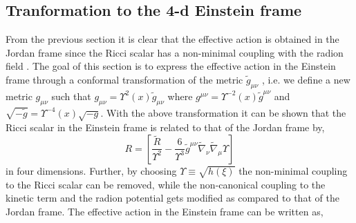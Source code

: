 \documentclass{article}
\begin{document}
  
\subsection{Tranformation to the 4-d Einstein frame}
\label{S3-2}
From the previous section it is clear that the effective action is obtained in the Jordan frame since the Ricci scalar has a non-minimal coupling with the radion field \cite{Karam:2018squ}. The goal of this section is to express the effective action in the Einstein frame through a conformal transformation of the metric $\tilde{g}_{\mu\nu}$ \cite{PhysRevD.65.023521,RevModPhys.82.451,DeFelice2010,PhysRevD.92.026008,0264-9381-14-12-010,BARROW1988515,1475-7516-2005-04-014,PhysRevD.76.084039,1475-7516-2013-10-040}, i.e. we define a new metric $g_{\mu\nu}$ such that $g_{\mu\nu}=\Upsilon^2(x) \tilde{g}_{\mu\nu}$ where $g^{\mu\nu}=\Upsilon^{-2}(x) \tilde{g}^{\mu\nu}$ and $\sqrt{-\tilde{g}}=\Upsilon^{-4}(x)\sqrt{-g}$.
With the above transformation it can be shown that the Ricci scalar in the Einstein frame is related to that of the Jordan frame by,
\begin{equation}
R=\left[\frac{\tilde{R}}{\Upsilon^2}
-\frac{6}{\Upsilon^3}\tilde{g}^{\mu\nu}\tilde{\nabla}_\nu\tilde{\nabla}_\mu\Upsilon \right]
\label{Eq16}
\end{equation}
in four dimensions.
Further, by choosing $\Upsilon \equiv \sqrt{h(\xi)}$ the non-minimal coupling to the Ricci scalar can be removed, while the non-canonical coupling to the kinetic term and the radion potential gets modified as compared to that of the Jordan frame. 
The effective action in the Einstein frame can be written as,









\end{document}
